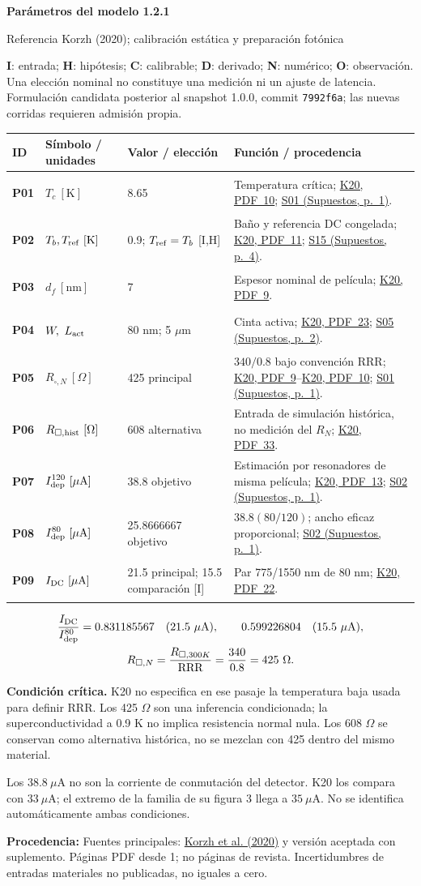 \documentclass[11pt,a4paper]{article}
\makeatletter
\newcommand{\block}[1]{\par\vspace{6pt}{\large\bfseries\color{ink}#1}\par\vspace{3pt}}
\newcommand{\critical}[1]{\par{\small\raggedright\textbf{\color{accent}Condición crítica.} #1\par}}
\newcommand{\origin}[1]{\par{\footnotesize\raggedright\color{ink}\textbf{Procedencia:} #1\par}}
\newcommand{\K}[1]{\href{https://eprints.lancs.ac.uk/id/eprint/140252/3/Binder1.pdf\#page=#1}{K20, PDF~#1}}
\newcommand{\sref}[2]{\href{Supuestos.pdf\#nameddest=#1}{#1 (Supuestos, p.~#2)}}
\newcommand{\ptrow}[4]{\hypertarget{#1}{\textbf{#1}}&\( \displaystyle #2 \)& #3 & #4\\[4pt]}
\newenvironment{ptable}{\par\small\setlength{\tabcolsep}{4pt}\renewcommand{\arraystretch}{1.12}
\begin{tabular}{@{}p{.075\linewidth}p{.225\linewidth}p{.285\linewidth}p{.355\linewidth}@{}}\hline
\textbf{ID}&\textbf{Símbolo / unidades}&\textbf{Valor / elección}&\textbf{Función / procedencia}\\\hline}
{\hline\end{tabular}\par}
\newcommand{\smallnote}[1]{{\small #1\par}}
\makeatother
\begin{document}
{\LARGE\bfseries\color{ink}Parámetros del modelo 1.2.1}\par
{\large Referencia Korzh (2020); calibración estática y preparación fotónica}\par
\smallnote{\textbf{I}: entrada; \textbf{H}: hipótesis; \textbf{C}: calibrable; \textbf{D}: derivado; \textbf{N}: numérico; \textbf{O}: observación. Una elección nominal no constituye una medición ni un ajuste de latencia. Formulación candidata posterior al snapshot 1.0.0, commit \texttt{7992f6a}; las nuevas corridas requieren admisión propia.}
\block{Material y caso de referencia}
\begin{ptable}
\ptrow{P01}{T_c\ [\mathrm K]}{8.65 \quad [I]}{Temperatura crítica; \K{10}; \sref{S01}{1}.}
\ptrow{P02}{T_b,T_{\rm ref}\ [\mathrm K]}{0.9; $T_{\rm ref}=T_b$ [I,H]}{Baño y referencia DC congelada; \K{11}; \sref{S15}{4}.}
\ptrow{P03}{d_f\ [\mathrm{nm}]}{7 \quad [I]}{Espesor nominal de película; \K{9}.}
\ptrow{P04}{W,\ L_{\rm act}}{80 nm; 5 $\mu$m \quad [I]}{Cinta activa; \K{23}; \sref{S05}{2}.}
\ptrow{P05}{R_{\square,N}\ [\Omega]}{425 principal \quad [H]}{$340/0.8$ bajo convención RRR; \K{9}--\K{10}; \sref{S01}{1}.}
\ptrow{P06}{R_{\square,\rm hist}\ [\Omega]}{608 alternativa \quad [H]}{Entrada de simulación histórica, no medición del $R_N$; \K{33}.}
\ptrow{P07}{I_{\rm dep}^{120}\ [\mu\mathrm A]}{38.8 objetivo \quad [I,H]}{Estimación por resonadores de misma película; \K{13}; \sref{S02}{1}.}
\ptrow{P08}{I_{\rm dep}^{80}\ [\mu\mathrm A]}{25.8666667 objetivo \quad [D,H]}{$38.8(80/120)$; ancho eficaz proporcional; \sref{S02}{1}.}
\ptrow{P09}{I_{\rm DC}\ [\mu\mathrm A]}{21.5 principal; 15.5 comparación [I]}{Par 775/1550 nm de 80 nm; \K{22}.}
\end{ptable}
\begin{gather*}
 \frac{I_{\rm DC}}{I_{\rm dep}^{80}}=
 0.831185567\quad (21.5\ \mu{\rm A}),\qquad
 0.599226804\quad (15.5\ \mu{\rm A}),\\
 R_{\square,N}=\frac{R_{\square,300K}}{\mathrm{RRR}}
 =\frac{340}{0.8}=425\ \Omega .
\end{gather*}
\critical{K20 no especifica en ese pasaje la temperatura baja usada para definir RRR. Los 425 $\Omega$ son una inferencia condicionada; la superconductividad a 0.9 K no implica resistencia normal nula. Los 608 $\Omega$ se conservan como alternativa histórica, no se mezclan con 425 dentro del mismo material.}
\smallnote{Los $38.8\ \mu$A no son la corriente de conmutación del detector. K20 los compara con $33\ \mu$A; el extremo de la familia de su figura 3 llega a $35\ \mu$A. No se identifica automáticamente ambas condiciones.}
\vfill
\origin{Fuentes principales: \href{https://doi.org/10.1038/s41566-020-0589-x}{Korzh et al. (2020)} y versión aceptada con suplemento. Páginas PDF desde 1; no páginas de revista. Incertidumbres de entradas materiales no publicadas, no iguales a cero.}
\newpage
\end{document}
